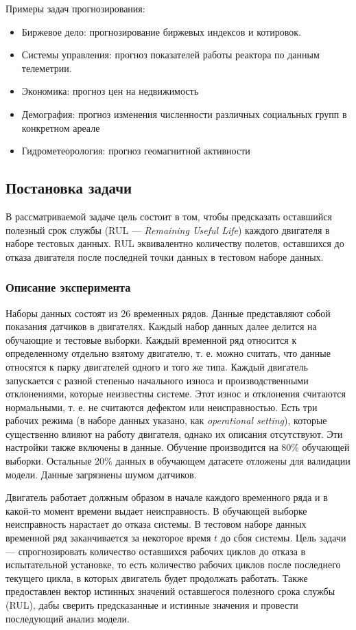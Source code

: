 \documentclass[14pt]{extarticle}
\begin{document}
Примеры задач прогнозирования:
\begin{itemize}
	
	\item Биржевое дело: прогнозирование биржевых индексов и котировок.
	\item Системы управления: прогноз показателей работы реактора по данным телеметрии.
	\item Экономика: прогноз цен на недвижимость
	\item Демография: прогноз изменения численности различных социальных групп в конкретном ареале
	\item Гидрометеорология: прогноз геомагнитной активности
	
\end{itemize}

\subsection{Постановка задачи}

В рассматриваемой задаче цель состоит в том, чтобы предсказать оставшийся полезный срок службы (RUL --- {\it Remaining Useful Life}) каждого двигателя в наборе тестовых данных. RUL эквивалентно количеству полетов, оставшихся до отказа двигателя после последней точки данных в тестовом наборе данных.

\subsubsection{Описание эксперимента}

Наборы данных состоят из 26 временных рядов. Данные представляют собой показания датчиков в двигателях. Каждый набор данных далее делится на обучающие и тестовые выборки. Каждый временной ряд относится к определенному отдельно взятому двигателю, т. е. можно считать, что данные относятся к парку двигателей одного и того же типа. Каждый двигатель запускается с разной степенью начального износа и производственными отклонениями, которые неизвестны системе. Этот износ и отклонения считаются нормальными, т. е. не считаются дефектом или неисправностью. Есть три рабочих режима (в наборе данных указано, как {\it operational setting}), которые существенно влияют на работу двигателя, однако их описания отсутствуют.  Эти настройки также включены в данные. Обучение производится на 80\% обучающей выборки. Остальные 20\% данных в обучающем датасете отложены для валидации модели. Данные загрязнены шумом датчиков.

Двигатель работает должным образом в начале каждого временного ряда и в какой-то момент времени выдает неисправность. В обучающей выборке неисправность нарастает до отказа системы. В тестовом наборе данных временной ряд заканчивается за некоторое время $t$ до сбоя системы. Цель задачи --- спрогнозировать количество оставшихся рабочих циклов до отказа в испытательной установке, то есть количество рабочих циклов после последнего текущего цикла, в которых двигатель будет продолжать работать. Также предоставлен вектор истинных значений оставшегося полезного срока службы (RUL), дабы сверить предсказанные и истинные значения и провести последующий анализ модели. 
\end{document}
